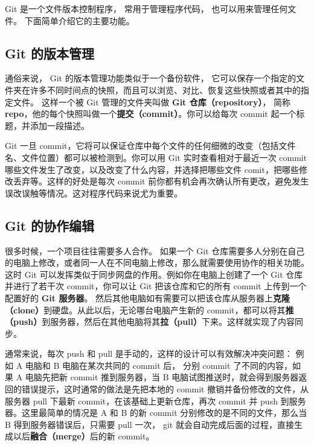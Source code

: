 
Git 是一个文件版本控制程序， 常用于管理程序代码， 也可以用来管理任何文件。 下面简单介绍它的主要功能。

\subsection{Git 的版本管理}
通俗来说， Git 的版本管理功能类似于一个备份软件， 它可以保存一个指定的文件夹在许多不同时间点的快照，而且可以浏览、对比、恢复这些快照或者其中的指定文件。 这样一个被 Git 管理的文件夹叫做 \textbf{Git 仓库（repository）}， 简称 \textbf{repo}，他的每个快照叫做一个\textbf{提交（commit）}。你可以给每次 commit 起一个标题，并添加一段描述。


Git 一旦 commit，它将可以保证仓库中每个文件的任何细微的改变（包括文件名、文件位置）都可以被检测到。你可以用 Git 实时查看相对于最近一次 commit 哪些文件发生了改变，以及改变了什么内容，并选择把哪些文件 comit，把哪些修改丢弃等。这样的好处是每次 commit 前你都有机会再次确认所有更改，避免发生误改误触等情况。这对程序代码来说尤为重要。

\subsection{Git 的协作编辑}
很多时候，一个项目往往需要多人合作。 如果一个 Git 仓库需要多人分别在自己的电脑上修改，或者同一人在不同电脑上修改，那么就需要使用协作的相关功能。 这时 Git 可以发挥类似于同步网盘的作用。例如你在电脑上创建了一个 Git 仓库并进行了若干次 commit，你可以让 Git 把该仓库和它的所有 commit 上传到一个配置好的 \textbf{Git 服务器}。 然后其他电脑如有需要可以把该仓库从服务器上\textbf{克隆（clone）}到硬盘。从此以后，无论哪台电脑产生新的 commit，都可以将其\textbf{推（push）}到服务器，然后在其他电脑将其\textbf{拉（pull）}下来。这样就实现了内容同步。

通常来说，每次 push 和 pull 是手动的，这样的设计可以有效解决冲突问题： 例如 A 电脑和 B 电脑在某次共同的 commit 后， 分别 commit 了不同的内容，如果 A 电脑先把新 commit 推到服务器，当 B 电脑试图推送时，就会得到服务器返回的错误提示，这时通常的做法是先把本地的 commit 撤销并备份修改的文件，从服务器 pull 下最新 commit，在该基础上更新仓库，再次 commit 并 push 到服务器。这里最简单的情况是 A 和 B 的新 commit 分别修改的是不同的文件，那么当 B 得到服务器错误后，只需要 pull 一次， git 就会自动完成后面的过程，直接生成以后\textbf{融合（merge）}后的新 commit。

